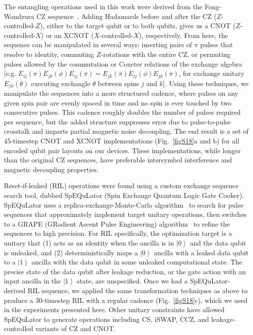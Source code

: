 \documentclass[aps,prl,twocolumn,superscriptaddress,nobibnotes,10pt,floatfix]{revtex4-2}
\newcommand{\figref}[1]{Fig.~\ref{#1}}
\begin{document}
The entangling operations used in this work were derived from the Fong-Wandzura CZ sequence~\cite{s_fong_universal_2011}. Adding Hadamards before and after the CZ ($Z$-controlled-$Z$), either to the target qubit or to both qubits, gives us a CNOT ($Z$-controlled-$X$) or an XCNOT ($X$-controlled-$X$), respectively.
From here, the sequence can be manipulated in several ways: inserting pairs of \(\pi\) pulses that resolve to identity, commuting $Z$-rotations with the entire CZ, or permuting pulses allowed by the commutation or Coxeter relations of the exchange algebra [e.g. \(E_{ij}(\pi)E_{jk}(\phi)E_{ij}(\pi) = E_{jk}(\pi)E_{ij}(\phi)E_{jk}(\pi)\), for exchange unitary $E_{jk}(\theta)$ executing exchangle $\theta$ between spins $j$ and $k$].
Using these techniques, we manipulate the sequences into a more structured cadence, where pulses on any given spin pair are evenly spaced in time and no spin is ever touched by two consecutive pulses.
This cadence roughly doubles the number of pulses required per sequence, but the added structure suppresses error due to pulse-to-pulse crosstalk and imparts partial magnetic noise decoupling.
The end result is a set of 45-timestep CNOT and XCNOT implementations (\figref{figS18}a and b) for all encoded qubit pair layouts on our devices.
These implementations, while longer than the original CZ sequences, have preferable intersymbol interference and magnetic decoupling properties.

Reset-if-leaked (RIL) operations were found using a custom exchange sequence search tool, dubbed SpEQuLator (Spin Exchange Quantum Logic Gate Cooker).
SpEQuLator uses a replica-exchange-Monte-Carlo algorithm~\cite{s_hukushima_exchange_1996} to search for pulse sequences that approximately implement target unitary operations, then switches to a GRAPE (GRadient Ascent Pulse Engineering) algorithm~\cite{s_khaneja_optimal_2005}  to refine the sequences to high precision.
For RIL specifically, the optimization target is a unitary that (1) acts as an identity when the ancilla is in \(\left. |0 \right\rangle\) and the data qubit is unleaked, and (2) deterministically maps a \(\left. |0 \right\rangle\) ancilla with a leaked data qubit to a \(\left. |1 \right\rangle\) ancilla with the data qubit in some unleaked computational state.
The precise state of the data qubit after leakage reduction, or the gate action with an input ancilla in the \(\left. |1 \right\rangle\) state, are unspecified.
Once we had a SpEQuLator-derived RIL sequence, we applied the same transformation techniques as above to produce a 30-timestep RIL with a regular cadence (\figref{figS18}c), which we used in the experiments presented here.
Other unitary constraints have allowed SpEQuLator to generate operations including CS, iSWAP, CCZ, and leakage-controlled variants of CZ and CNOT.
\end{document}
